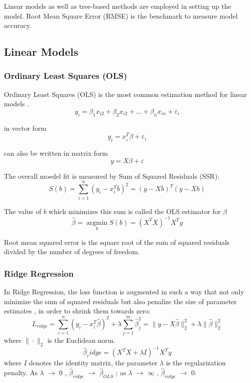 \documentclass[11pt, a4paper, leqno]{article}
\begin{document}
Linear models as well as tree-based methods are employed in setting up the model.  Root Mean Square Error (RMSE) is the benchmark to measure model accuracy.

\subsection{Linear Models}
\subsubsection{Ordinary Least Squares (OLS)}
Ordinary Least Squares (OLS) is the most common estimation method for linear models \cite{fox1997applied}.
\begin{equation}
y_i=\beta_1x_{i2}+\beta_2x_{i2}+\dots+\beta_nx_{in}+\varepsilon_i
\end{equation}

in vector form
\begin{equation}
y_i=x_i^T\beta+\varepsilon_i
\end{equation}

can also be written in matrix form
\begin{equation}
y=X\beta+\varepsilon
\end{equation}

The overall moedel fit is measured by Sum of Squared Residuals (SSR):
\begin{equation}
 S(b)=\sum_{i=1}^{n}(y_i-x_i^Tb)^2=(y-Xb)^T(y-Xb)
\end{equation}

The value of $b$ which minimizes this sum is called the OLS estimator for $\beta$
\begin{equation}
\hat{\beta}=\operatorname*{argmin}_b S(b)=(X^TX)^{-1}X^Ty
\end{equation}

Root mean squared error is the square root of the sum of squared residuals divided by the number of degrees of freedom.

\subsubsection{Ridge Regression}
In Ridge Regression, the loss function is augmented in such a way that not only minimize the sum of squared residuals but also penalize the size of parameter estimates \cite{jain2016complete}, in order to shrink them towards zero:
\begin{equation}
L_{ridge}=\sum_{i=1}^{n}(y_i-x_i^T\hat{\beta})^2+\lambda\sum_{j=1}^{m}\hat{\beta}_j^2=\|y-X\hat{\beta}\|_2^2+\lambda\|\hat{\beta}\|_2^2
\end{equation}
where $\|\cdot \|_2$ is the Euclidean norm.
\begin{equation}
\hat{\beta}_ridge=(X^TX+\lambda I)^{-1}X^Ty
\end{equation}
where $I$ denotes the identity matrix, the parameter $\lambda$ is the regularization penalty. As $\lambda$ $\to$ $0$ , $\hat{\beta}_{ridge}$ $\to$  $\hat{\beta}_{OLS}$ ; as $\lambda$ $\to$ $\infty$ , $\hat{\beta}_{ridge}$ $\to$ $0$.
\end{document}
